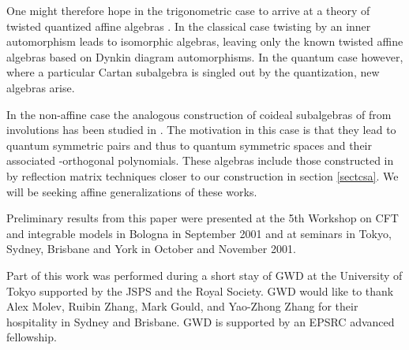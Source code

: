 \documentclass[a4paper,12pt]{article}
\numberwithin{equation}{section}
\begin{document}
One might therefore hope in the trigonometric case to arrive at a
theory of twisted quantized affine algebras
\coordHE{}. In the classical case twisting by
an inner automorphism leads to isomorphic algebras, leaving only
the known twisted affine algebras based on Dynkin diagram
automorphisms. In the quantum case however, where a particular
Cartan subalgebra is singled out by the quantization, new algebras
arise.

In the non-affine case the analogous construction of coideal
subalgebras of \coordHE{} from involutions has been studied in
\cite{Let01}. The motivation in this case is that they lead to
quantum symmetric pairs and thus to quantum symmetric spaces and
their associated \coordHE{}-orthogonal polynomials. These algebras
include those constructed in \cite{Nou} by reflection matrix
techniques closer to our construction in section \ref{sectcsa}. We
will be seeking affine generalizations of these works.

Preliminary results from this paper were presented at the 5th
Workshop on CFT and integrable models in Bologna in September 2001
and at seminars in Tokyo, Sydney, Brisbane and York in October and
November 2001.



Part of this work was performed during a short stay of GWD at the
University of Tokyo supported by the JSPS and the Royal Society.
GWD would like to thank Alex Molev, Ruibin Zhang, Mark Gould, and
Yao-Zhong Zhang for their hospitality in Sydney and Brisbane. GWD
is supported by an EPSRC advanced fellowship.
\end{document}
